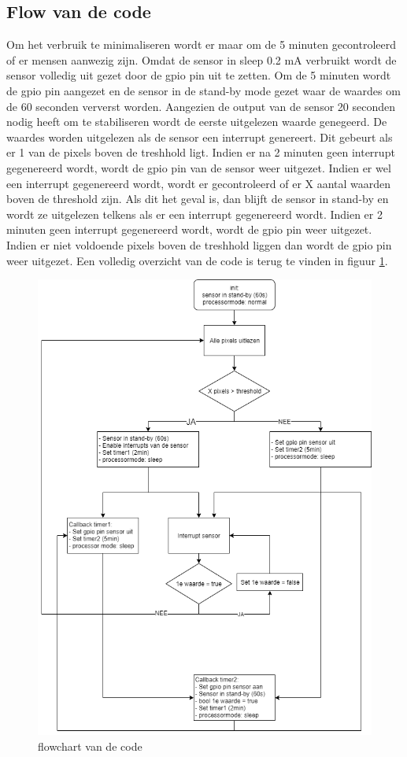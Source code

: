 \documentclass[]{article}
\begin{document}
\subsection{Flow van de code}
\label{flowcode}
Om het verbruik te minimaliseren wordt er maar om de 5 minuten gecontroleerd of er mensen aanwezig zijn. Omdat de sensor in sleep 0.2 mA verbruikt wordt de sensor volledig uit gezet door de gpio pin uit te zetten. Om de 5 minuten wordt de gpio pin aangezet en de sensor in de stand-by mode gezet waar de waardes om de 60 seconden ververst worden. Aangezien de output van de sensor 20 seconden nodig heeft om te stabiliseren wordt de eerste uitgelezen waarde genegeerd. De waardes worden uitgelezen als de sensor een interrupt genereert. Dit gebeurt als er 1 van de pixels boven de treshhold ligt. Indien er na 2 minuten geen interrupt gegenereerd wordt, wordt de gpio pin van de sensor weer uitgezet. Indien er wel een interrupt gegenereerd wordt, wordt er gecontroleerd of er X aantal waarden boven de threshold zijn. Als dit het geval is, dan blijft de sensor in stand-by en wordt ze uitgelezen telkens als er een interrupt gegenereerd wordt. Indien er 2 minuten geen interrupt gegenereerd wordt, wordt de gpio pin weer uitgezet. Indien er niet voldoende pixels boven de treshhold liggen dan wordt de gpio pin weer uitgezet. Een volledig overzicht van de code is terug te vinden in figuur \ref{fig:flowchart}.
\begin{figure}[!ht]
	\centering
	\includegraphics[scale=0.5]{flowchartcode.png}
	\caption{flowchart van de code}
	\label{fig:flowchart}
\end{figure}
\end{document}

